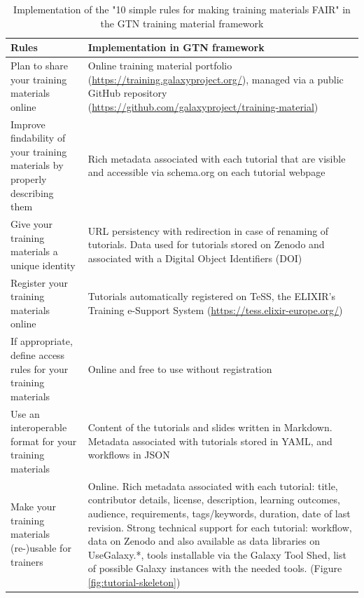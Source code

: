 \documentclass[10pt,letterpaper]{article}
\begin{document}
\begin{table}[h!]
	\centering
    \caption{Implementation of the "10 simple rules for making training materials FAIR" \cite{Garcia2020} in the GTN training material framework
    \label{tbl:rulesforfair}}
	\begin{tabular}{p{}p{}}
		\textbf{Rules}                                                                & \textbf{Implementation in GTN framework}\\\hline
		Plan to share your training materials online                                  & Online training material portfolio (\url{https://training.galaxyproject.org/}), managed via a public GitHub repository (\url{https://github.com/galaxyproject/training-material})\\
		Improve findability of your training materials by properly describing them    & Rich metadata associated with each tutorial that are visible and accessible via schema.org on each tutorial webpage\\
		Give your training materials a unique identity                                & URL persistency with redirection in case of renaming of tutorials.
		Data used for tutorials stored on Zenodo and associated with a Digital Object Identifiers (DOI) \\
        Register your training materials online                                       & Tutorials automatically registered on TeSS, the ELIXIR's Training e-Support System (\url{https://tess.elixir-europe.org/})  \\
        If appropriate, define access rules for your training materials               &	Online and free to use without registration \\
        Use an interoperable format for your training materials                       &	Content of the tutorials and slides written in Markdown. Metadata associated with tutorials stored in YAML, and workflows in JSON\\
		Make your training materials (re-)usable for trainers                          & Online. Rich metadata associated with each tutorial: title, contributor details, license, description, learning outcomes, audience, requirements, tags/keywords, duration, date of last revision. Strong technical support for each tutorial: workflow, data on Zenodo and also available as data libraries on UseGalaxy.*, tools installable via the Galaxy Tool Shed, list of possible Galaxy instances with the needed tools. (Figure \ref{fig:tutorial-skeleton})\\

\end{tabular}
\end{table}
\end{document}
